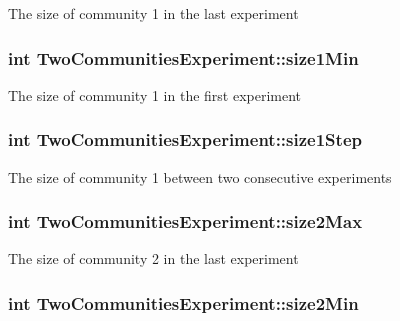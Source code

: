 The size of community 1 in the last experiment \hypertarget{class_two_communities_experiment_a32820f7a153564c07f9b2c60b1b0a802}{
\subsubsection[{size1\-Min}]{\setlength{\rightskip}{0pt plus 5cm}int Two\-Communities\-Experiment\-::size1\-Min}}\label{class_two_communities_experiment_a32820f7a153564c07f9b2c60b1b0a802}
The size of community 1 in the first experiment \hypertarget{class_two_communities_experiment_a094cc2008529793f463ce298d76e8663}{
\subsubsection[{size1\-Step}]{\setlength{\rightskip}{0pt plus 5cm}int Two\-Communities\-Experiment\-::size1\-Step}}\label{class_two_communities_experiment_a094cc2008529793f463ce298d76e8663}
The size of community 1 between two consecutive experiments \hypertarget{class_two_communities_experiment_ad2ad665e665ba1c2e5ec6ece13190d1e}{
\subsubsection[{size2\-Max}]{\setlength{\rightskip}{0pt plus 5cm}int Two\-Communities\-Experiment\-::size2\-Max}}\label{class_two_communities_experiment_ad2ad665e665ba1c2e5ec6ece13190d1e}
The size of community 2 in the last experiment \hypertarget{class_two_communities_experiment_a0735678625778f49f3f05d18b5248a55}{
\subsubsection[{size2\-Min}]{\setlength{\rightskip}{0pt plus 5cm}int Two\-Communities\-Experiment\-::size2\-Min}}\label{class_two_communities_experiment_a0735678625778f49f3f05d18b5248a55}
